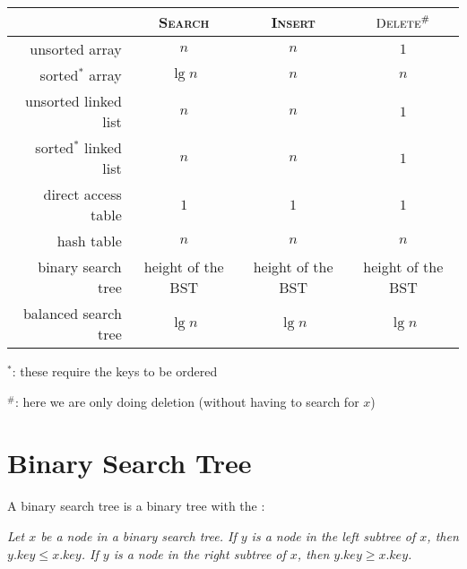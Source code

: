 \begin{table}[H]
    \centering
    \begin{tabular}{r | c c c}                                                                   \hline
                               & \textsc{Search}   & \textsc{Insert}   & $\textsc{Delete}^\#$ \\ \hline
        unsorted array         & $n$               & $n$               & $1$                  \\
        sorted$^*$ array       & $\lg n$           & $n$               & $n$                  \\
        unsorted linked list   & $n$               & $n$               & $1$                  \\
        sorted$^*$ linked list & $n$               & $n$               & $1$                  \\ \hline
        direct access table    & $1$               & $1$               & $1$                  \\
        hash table             & $n$               & $n$               & $n$                  \\ \hline
        binary search tree     & height of the BST & height of the BST & height of the BST    \\
        balanced search tree   & $\lg n$           & $\lg n$           & $\lg n$              \\ \hline
    \end{tabular}
\end{table}


$^*$: these require the keys to be ordered

$^\#$: here we are only doing deletion (without having to search for $x$)

\section{Binary Search Tree}

A binary search tree is a binary tree with the :

\textit{Let $x$ be a node in a binary search tree. If $y$ is a node in the left subtree of $x$, then $y.\textit{key} \leq x.\textit{key}$. If $y$ is a node in the right subtree of $x$, then $y.\textit{key} \geq x.\textit{key}$.}

